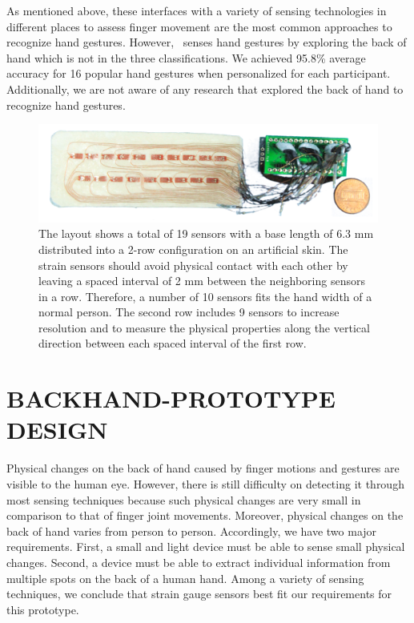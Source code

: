 \documentclass{sigchi}
\begin{document}
As mentioned above, these interfaces with a variety of sensing technologies in different places to assess finger movement are the most common approaches to recognize hand gestures. However, \getTitleName\ senses hand gestures by exploring the back of hand which is not in the three classifications. We achieved 95.8\% average accuracy for 16 popular hand gestures when personalized for each participant. Additionally, we are not aware of any research that explored the back of hand to recognize hand gestures.

\begin{figure}[b]
 \begin{center}
  \includegraphics[width=1\columnwidth]{figures/prototypeV2.jpg}
  \caption{The layout shows a total of 19 sensors with a base length of 6.3 mm distributed into a 2-row configuration on an artificial skin. The strain sensors should avoid physical contact with each other by leaving a spaced interval of 2 mm between the neighboring sensors in a row. Therefore, a number of 10 sensors fits the hand width of a normal person. The second row includes 9 sensors to increase resolution and to measure the physical properties along the vertical direction between each spaced interval of the first row.}
  \label{fig:tie}
  \end{center}
\end{figure}

\section{BACKHAND-PROTOTYPE DESIGN}

Physical changes on the back of hand caused by finger motions and gestures are visible to the human eye. However, there is still difficulty on detecting it through most sensing techniques because such physical changes are very small in comparison to that of finger joint movements. Moreover, physical changes on the back of hand varies from person to person. Accordingly, we have two major requirements. First, a small and light device must be able to sense small physical changes. Second, a device must be able to extract individual information from multiple spots on the back of a human hand. Among a variety of sensing techniques, we conclude that strain gauge sensors best fit our requirements for this prototype.
 
\end{document}

